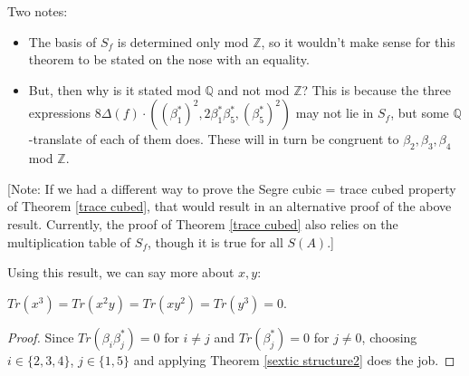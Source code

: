 \documentclass{article}
\begin{document}
Two notes:
\begin{itemize}
\item The basis of $S_f$ is determined only mod $\mathbb{Z}$, so it wouldn't make sense for this theorem to be stated on the nose with an equality.
\item But, then why is it stated mod $\mathbb{Q}$ and not mod $\mathbb{Z}$?  This is because the three expressions $8 \Delta(f) \cdot ((\beta_1^*)^2, 2 \beta_1^* \beta_5^*, (\beta_5^*)^2)$ may not lie in $S_f$, but some $\mathbb{Q}$-translate of each of them does.  These will in turn be congruent to $\beta_2, \beta_3, \beta_4$ mod $\mathbb{Z}$.
\end{itemize}

[Note:   If we had a different way to prove the Segre cubic = trace cubed property of Theorem \ref{trace cubed}, that would result in an alternative proof of the above result.  Currently, the proof of Theorem \ref{trace cubed} also relies on the multiplication table of $S_f$, though it is true for all $S(A)$.]

Using this result, we can say more about $x,y$:
\begin{lemma}
$Tr(x^3) = Tr(x^2 y) = Tr(x y^2) = Tr(y^3) = 0$.
\end{lemma}
\begin{proof}
Since $Tr(\beta_i \beta_j^*) = 0$ for $i \neq j$ and $Tr(\beta_j^*) = 0$ for $j \neq 0$, choosing $i \in \{2,3,4\}$, $j \in \{1,5\}$ and applying Theorem \ref{sextic structure2} does the job.
\end{proof}
\end{document}
